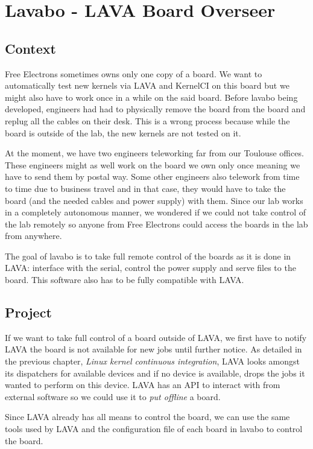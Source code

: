 \chapter{Lavabo - LAVA Board Overseer}
\section{Context}

Free Electrons sometimes owns only one copy of a board. We want to automatically test new kernels via LAVA and KernelCI on this board but we might also have to work once in a while on the said board. Before lavabo being developed, engineers had had to physically remove the board from the board and replug all the cables on their desk. This is a wrong process because while the board is outside of the lab, the new kernels are not tested on it.

At the moment, we have two engineers teleworking far from our Toulouse offices. These engineers might as well work on the board we own only once meaning we have to send them by postal way. Some other engineers also telework from time to time due to business travel and in that case, they would have to take the board (and the needed cables and power supply) with them. Since our lab works in a completely autonomous manner, we wondered if we could not take control of the lab remotely so anyone from Free Electrons could access the boards in the lab from anywhere.

The goal of lavabo is to take full remote control of the boards as it is done in LAVA: interface with the serial, control the power supply and serve files to the board. This software also has to be fully compatible with LAVA.

\section{Project}

If we want to take full control of a board outside of LAVA, we first have to notify LAVA the board is not available for new jobs until further notice. As detailed in the previous chapter, \textit{Linux kernel continuous integration}, LAVA looks amongst its dispatchers for available devices and if no device is available, drops the jobs it wanted to perform on this device. LAVA has an API to interact with from external software so we could use it to \textit{put offline} a board.

Since LAVA already has all means to control the board, we can use the same tools used by LAVA and the configuration file of each board in lavabo to control the board.

